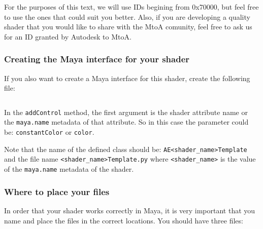 For the purposes of this text, we will use IDs begining from 0x70000, but feel free to use the ones that could suit you better.
Also, if you are developing a quality shader that you would like to share with the MtoA comunity, feel free to ask us for an ID granted by Autodesk to MtoA.

\subsubsection{Creating the Maya interface for your shader}

If you also want to create a Maya interface for this shader, create the following file:\\

\inputminted[mathescape,
linenos,
numbersep=5pt,
frame=lines,
framesep=2mm,
baselinestretch=1,
fontsize=\footnotesize,
tabsize=3,
label=mySimpleTemplate.py]
{python}{mySimpleTemplate.py}

In the \texttt{addControl} method, the first argument is the shader attribute name or the \texttt{maya.name} metadata of that attribute.
So in this case the parameter could be: \texttt{constantColor} or \texttt{color}.

Note that the name of the defined class should be: \verb|AE<shader_name>Template| and the file name \verb|<shader_name>Template.py| where \verb|<shader_name>| is the value of the \verb|maya.name| metadata of the shader.

\subsubsection{Where to place your files}

In order that your shader works correctly in Maya, it is very important that you name and place the files in the correct locations. You should have three files:

